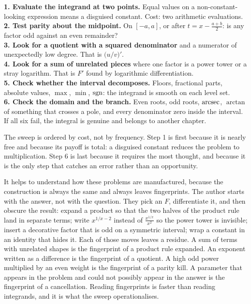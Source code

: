 \begin{keynote}
\textbf{1. Evaluate the integrand at two points.} Equal values on a non-constant-looking expression means a disguised constant. Cost: two arithmetic evaluations.\\
\textbf{2. Test parity about the midpoint.} On $[-a,a]$, or after $t=x-\tfrac{a+b}{2}$: is any factor odd against an even remainder?\\
\textbf{3. Look for a quotient with a squared denominator} and a numerator of unexpectedly low degree. That is $\bigl(u/v\bigr)'$.\\
\textbf{4. Look for a sum of unrelated pieces} where one factor is a power tower or a stray logarithm. That is $F'$ found by logarithmic differentiation.\\
\textbf{5. Check whether the interval decomposes.} Floors, fractional parts, absolute values, $\max$, $\min$, $\operatorname{sgn}$: the integrand is smooth on each level set.\\
\textbf{6. Check the domain and the branch.} Even roots, odd roots, $\operatorname{arcsec}$, $\arctan$ of something that crosses a pole, and every denominator zero inside the interval.\\
If all six fail, the integral is genuine and belongs to another chapter.
\end{keynote}

The sweep is ordered by cost, not by frequency. Step 1 is first because it is nearly free and because its payoff is total: a disguised constant reduces the problem to multiplication. Step 6 is last because it requires the most thought, and because it is the only step that catches an error rather than an opportunity.

It helps to understand how these problems are manufactured, because the construction is always the same and always leaves fingerprints. The author starts with the answer, not with the question. They pick an $F$, differentiate it, and then obscure the result: expand a product so that the two halves of the product rule land in separate terms; write $x^{1/x-2}$ instead of $\tfrac{x^{1/x}}{x^{2}}$ so the power tower is invisible; insert a decorative factor that is odd on a symmetric interval; wrap a constant in an identity that hides it. Each of those moves leaves a residue. A sum of terms with unrelated shapes is the fingerprint of a product rule expanded. An exponent written as a difference is the fingerprint of a quotient. A high odd power multiplied by an even weight is the fingerprint of a parity kill. A parameter that appears in the problem and could not possibly appear in the answer is the fingerprint of a cancellation. Reading fingerprints is faster than reading integrands, and it is what the sweep operationalises.

